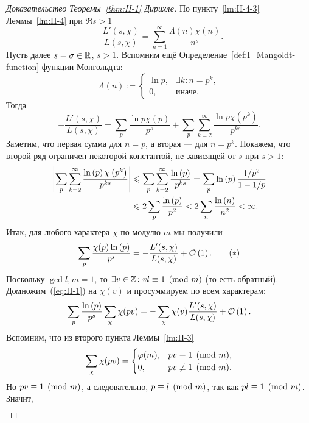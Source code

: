 \begin{proof}[Доказательство Теоремы~\ref{thm:II-1} Дирихле]
    По пункту~\ref{lm:II-4-3} Леммы~\ref{lm:II-4} при $\Re{s} > 1$
    \[
        -\frac{L'(s, \chi)}{L(s, \chi)} = \sum_{n=1}^{\infty} \frac{\Lambda(n)\chi(n)}{n^s}.
    \]
    Пусть далее $s = \sigma \in \mathbb{R}$, $s>1$. Вспомним ещё Определение~\ref{def:I_Mangoldt-function} функции Монгольдта:
    \[
        \Lambda(n) := 
        \begin{cases}
            \ln{p}, & \exists k\colon n = p^k, \\
            0, & \text{иначе}.
        \end{cases}
    \]
    Тогда
    \[
        -\frac{L'(s, \chi)}{L(s, \chi)} = \sum_p \frac{\ln{p} \chi(p)}{p^s} + \sum_p \sum_{k=2}^{\infty} \frac{\ln{p} \chi\left( p^k \right)}{p^{ks}}.
    \]
    Заметим, что первая сумма для $n = p$, а вторая --- для $n = p^k$. Покажем, что второй ряд ограничен некоторой константой, не зависящей от $s$ при $s > 1$:
    \begin{align*}
        \left| 
            \sum_p \sum_{k=2}^{\infty} \frac{\operatorname{ln}\left( p \right) \chi\left( p^k \right)}{p^{ks}}
         \right| &\leqslant \sum_p \sum_{k=2}^{\infty} \frac{\operatorname{ln}\left( p \right)}{p^{ks}} = \sum_p \operatorname{ln}\left( p \right) \frac{1 / p^2}{1 - 1 / p} \\
        &\leqslant 2\sum_p \frac{\operatorname{ln}\left( p \right)}{p^2} < 2\sum_n \frac{\operatorname{ln}\left( n \right)}{n^2} < \infty.
    \end{align*}
    Итак, для любого характера $\chi$ по модулю $m$ мы получили
    \begin{equation}
        \sum_p \frac{\chi(p)\operatorname{ln}\left( p \right)}{p^s} = -\frac{L'(s, \chi)}{L(s, \chi)} + \mathcal{O}\left( 1 \right). \tag{$\ast$}\label{eq:II-1}
    \end{equation}
    Поскольку $\gcd{l, m} = 1$, то $\exists v \in \mathbb{Z}\colon vl \equiv 1 \pmod m$ (то есть обратный). Домножим~(\ref{eq:II-1}) на $\chi(v)$ и просуммируем по всем характерам:
    \[
        \sum_p \frac{\operatorname{ln}\left( p \right)}{p^s} \sum_\chi \chi(pv) = -\sum_\chi \chi(v) \frac{L'(s, \chi)}{L(s, \chi)} + \mathcal{O}\left( 1 \right).
    \]
    Вспомним, что из второго пункта Леммы~\ref{lm:II-3}
    \[
        \sum_\chi \chi(pv) =
            \begin{cases}
                \varphi(m), & pv \equiv 1 \pmod m, \\
                0, & pv \not\equiv 1 \pmod{m}.
            \end{cases}
    \]
    Но $pv \equiv 1 \pmod m$, а следовательно, $p \equiv l \pmod m$, так как $pl \equiv 1 \pmod m$.~\newline
    Значит,
    \begin{align*}

\end{align*}
\end{proof}
